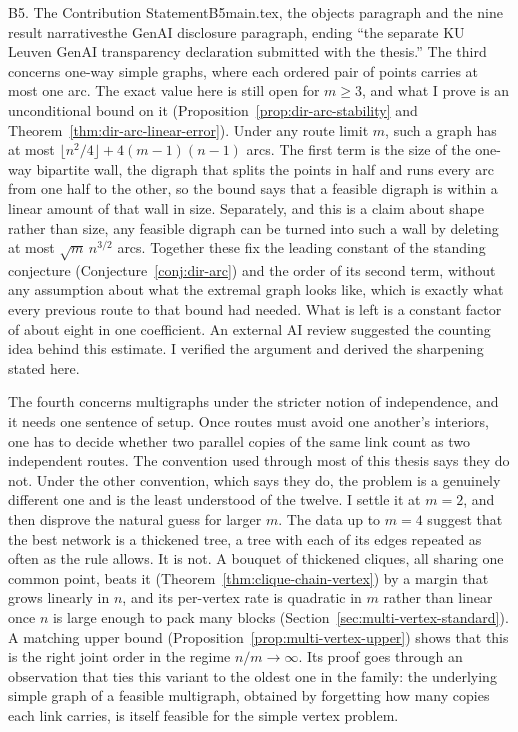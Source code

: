 \begin{offcutrewrite}{B5. The Contribution Statement}{B5}{main.tex, the objects paragraph and the nine result narratives}{the GenAI disclosure paragraph, ending ``the separate KU Leuven GenAI transparency declaration submitted with the thesis.''}
The third concerns one-way simple graphs, where each ordered pair of points carries at most one arc. The exact value here is still open for $m \ge 3$, and what I prove is an unconditional bound on it (Proposition~\ref{prop:dir-arc-stability} and Theorem~\ref{thm:dir-arc-linear-error}). Under any route limit $m$, such a graph has at most $\lfloor n^2/4\rfloor + 4(m-1)(n-1)$ arcs. The first term is the size of the one-way bipartite wall, the digraph that splits the points in half and runs every arc from one half to the other, so the bound says that a feasible digraph is within a linear amount of that wall in size. Separately, and this is a claim about shape rather than size, any feasible digraph can be turned into such a wall by deleting at most $\sqrt{m}\,n^{3/2}$ arcs. Together these fix the leading constant of the standing conjecture (Conjecture~\ref{conj:dir-arc}) and the order of its second term, without any assumption about what the extremal graph looks like, which is exactly what every previous route to that bound had needed. What is left is a constant factor of about eight in one coefficient. An external AI review suggested the counting idea behind this estimate. I verified the argument and derived the sharpening stated here.

The fourth concerns multigraphs under the stricter notion of independence, and it needs one sentence of setup. Once routes must avoid one another's interiors, one has to decide whether two parallel copies of the same link count as two independent routes. The convention used through most of this thesis says they do not. Under the other convention, which says they do, the problem is a genuinely different one and is the least understood of the twelve. I settle it at $m=2$, and then disprove the natural guess for larger $m$. The data up to $m=4$ suggest that the best network is a thickened tree, a tree with each of its edges repeated as often as the rule allows. It is not. A bouquet of thickened cliques, all sharing one common point, beats it (Theorem~\ref{thm:clique-chain-vertex}) by a margin that grows linearly in $n$, and its per-vertex rate is quadratic in $m$ rather than linear once $n$ is large enough to pack many blocks (Section~\ref{sec:multi-vertex-standard}). A matching upper bound (Proposition~\ref{prop:multi-vertex-upper}) shows that this is the right joint order in the regime $n/m\to\infty$. Its proof goes through an observation that ties this variant to the oldest one in the family: the underlying simple graph of a feasible multigraph, obtained by forgetting how many copies each link carries, is itself feasible for the simple vertex problem.


\end{offcutrewrite}
